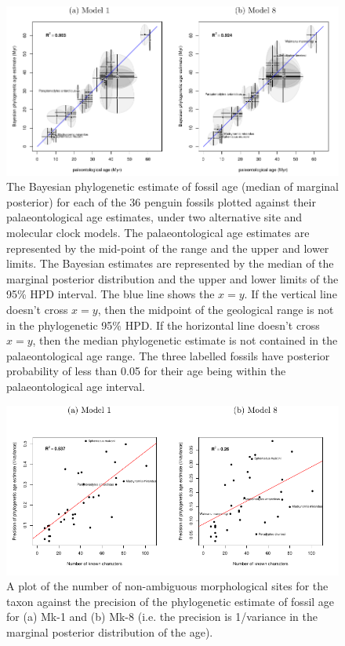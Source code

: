 \documentclass[11pt]{article}
\newcommand{\Mstrict}{{Mk-1}}
\newcommand{\Mrelaxed}{{Mk-8}}
\begin{document}
\begin{figure}
\includegraphics{Figure1.pdf}
\caption{\label{fig:phyloAgeVsGeoAge}
The Bayesian phylogenetic estimate of fossil age (median of marginal posterior) for each of the 36 penguin fossils plotted against their palaeontological age estimates, under two alternative site and molecular clock models. 
The palaeontological age estimates are represented by the mid-point of the range and the upper and lower limits. 
The Bayesian estimates are represented by the median of the marginal posterior distribution and the upper and lower limits of the 95\% HPD interval. 
The blue line shows the $x=y$. If the vertical line doesn't cross $x=y$, then the midpoint of the geological range is not in the phylogenetic 95\% HPD. 
If the horizontal line doesn't cross $x=y$, then the median phylogenetic estimate is not contained in the palaeontological age range. 
The three labelled fossils have posterior probability of less than 0.05 for their age being within the palaeontological age interval.
}
\end{figure}

\begin{figure}
\includegraphics[width=5in]{Figure2.pdf}
\caption{A plot of the number of non-ambiguous morphological sites for the taxon against the precision of the phylogenetic estimate of fossil age for (a) \Mstrict{} and (b) \Mrelaxed{} (i.e. the precision is 1/variance in the marginal posterior distribution of the age).}
\end{figure}
\end{document}

